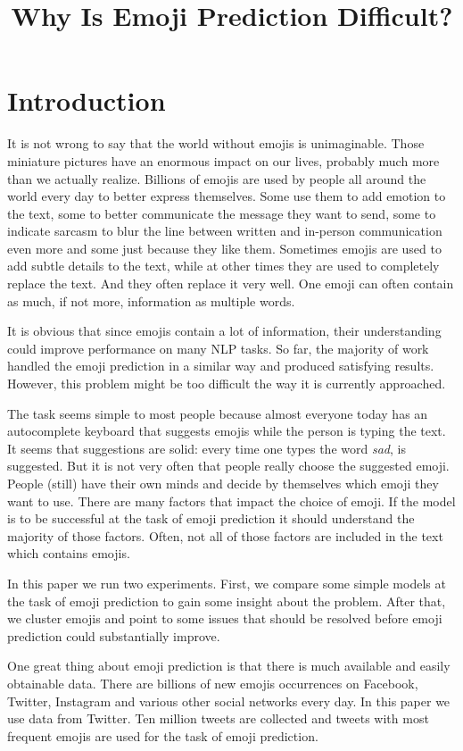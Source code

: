 \documentclass[10pt, a4paper]{article}
\title{Why Is Emoji Prediction Difficult?}
\begin{document}
\maketitleabstract

\section{Introduction}
It is not wrong to say that the world without emojis is unimaginable. Those 
miniature pictures have an enormous impact on our lives, probably much more than
we actually realize. Billions of emojis are used by people all around the world 
every day to better express themselves. Some use them to add emotion to the text, 
some to better communicate the message they want to send, some to indicate 
sarcasm to blur the line between written and in-person communication even more 
and some just because they like them. Sometimes emojis are used to add subtle 
details to the text, while at other times they are used to completely replace the text.
And they often replace it very well. One emoji can often contain as much, 
if not more, information as multiple words.

It is obvious that since emojis contain a lot of information, their understanding
could improve performance on many NLP tasks. So far, the majority of work handled
the emoji prediction in a similar way and produced satisfying results. However, 
this problem might be too difficult the way it is currently approached. 

The task seems simple to most people because almost everyone today has an 
autocomplete keyboard that suggests emojis while the person is typing the text. 
It seems that suggestions are solid: every time one types the word \emph{sad}, 
 is suggested. But it is not very often that people really choose 
the suggested emoji. People (still) have their own minds and decide by 
themselves which emoji they want to use. There are many factors that impact the 
choice of emoji. If the model is to be successful at the task of emoji 
prediction it should understand the majority of those factors. Often, not 
all of those factors are included in the text which contains emojis.

In this paper we run two experiments. First, we compare some simple models at 
the task of emoji prediction to gain some insight about the problem. After that, 
we cluster emojis and point to some issues that should be resolved before
emoji prediction could substantially improve.

One great thing about emoji prediction is that there is much available and 
easily obtainable data. There are billions of new emojis occurrences on 
Facebook, Twitter, Instagram and various other social networks every day. In 
this paper we use data from Twitter. Ten million tweets are collected and tweets
with most frequent emojis are used for the task of emoji prediction.
\end{document}
